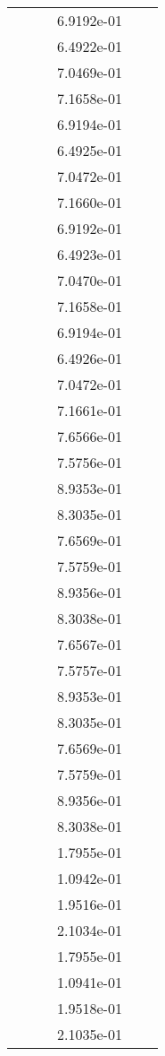 \begin{xltabular}{\textwidth}{r|rS[table-format=1.3e+2]S[table-format=1.4e+2]S[table-format=1.4e+2]S[table-format=-1.5]}
&  &  & 6.9192e-01 & & \\
&  &  & 6.4922e-01 & & \\
&  &  & 7.0469e-01 & & \\
&  &  & 7.1658e-01 & & \\
&  &  & 6.9194e-01 & & \\
&  &  & 6.4925e-01 & & \\
&  &  & 7.0472e-01 & & \\
&  &  & 7.1660e-01 & & \\
&  &  & 6.9192e-01 & & \\
&  &  & 6.4923e-01 & & \\
&  &  & 7.0470e-01 & & \\
&  &  & 7.1658e-01 & & \\
&  &  & 6.9194e-01 & & \\
&  &  & 6.4926e-01 & & \\
&  &  & 7.0472e-01 & & \\
&  &  & 7.1661e-01 & & \\
&  &  & 7.6566e-01 & & \\
&  &  & 7.5756e-01 & & \\
&  &  & 8.9353e-01 & & \\
&  &  & 8.3035e-01 & & \\
&  &  & 7.6569e-01 & & \\
&  &  & 7.5759e-01 & & \\
&  &  & 8.9356e-01 & & \\
&  &  & 8.3038e-01 & & \\
&  &  & 7.6567e-01 & & \\
&  &  & 7.5757e-01 & & \\
&  &  & 8.9353e-01 & & \\
&  &  & 8.3035e-01 & & \\
&  &  & 7.6569e-01 & & \\
&  &  & 7.5759e-01 & & \\
&  &  & 8.9356e-01 & & \\
&  &  & 8.3038e-01 & & \\
&  &  & 1.7955e-01 & & \\
&  &  & 1.0942e-01 & & \\
&  &  & 1.9516e-01 & & \\
&  &  & 2.1034e-01 & & \\
&  &  & 1.7955e-01 & & \\
&  &  & 1.0941e-01 & & \\
&  &  & 1.9518e-01 & & \\
&  &  & 2.1035e-01 & & \\

\end{xltabular}
